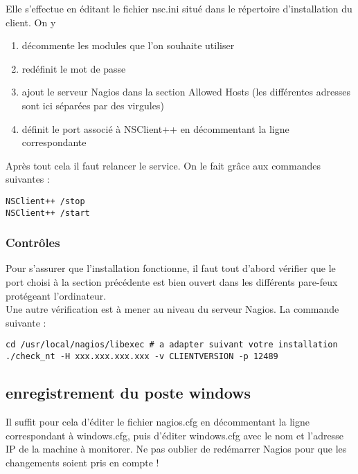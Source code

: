 Elle s'effectue en éditant le fichier nsc.ini situé dans le répertoire
d'installation du client. On y

\begin{enumerate}
\item décommente les modules que l'on souhaite utiliser
\item redéfinit le mot de passe
\item ajout le serveur Nagios dans la section Allowed Hosts (les
différentes adresses sont ici séparées par des virgules)
\item définit le port associé à NSClient++ en décommentant la ligne
correspondante
\end{enumerate}

Après tout cela il faut relancer le service. On le fait grâce aux commandes
suivantes :

\begin{verbatim}
NSClient++ /stop
NSClient++ /start
\end{verbatim}

\subsubsection{Contrôles}

Pour s'assurer que l'installation fonctionne, il faut tout d'abord vérifier
que le port choisi à la section précédente est bien ouvert dans les
différents pare-feux protégeant l'ordinateur.\\
Une autre vérification est à mener au niveau du serveur Nagios. La commande
suivante :

\begin{verbatim}
cd /usr/local/nagios/libexec # a adapter suivant votre installation
./check_nt -H xxx.xxx.xxx.xxx -v CLIENTVERSION -p 12489
\end{verbatim}

\subsection{enregistrement du poste windows}

Il suffit pour cela d'éditer le fichier nagios.cfg en décommentant la ligne
correspondant à windows.cfg, puis d'éditer windows.cfg avec le nom et
l'adresse IP de la machine à monitorer. Ne pas oublier de redémarrer Nagios
pour que les changements soient pris en compte !
